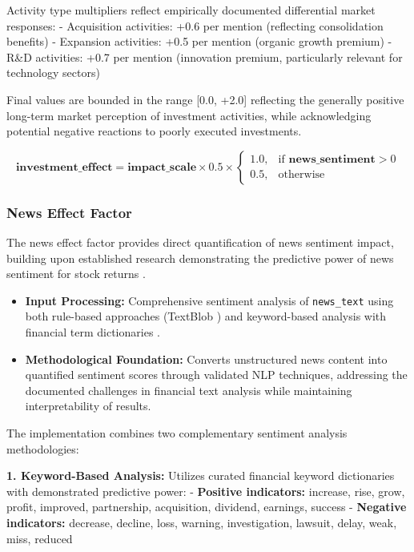 \documentclass[3p,times,procedia]{elsarticle}
\begin{document}
Activity type multipliers reflect empirically documented differential market responses:
- Acquisition activities: +0.6 per mention (reflecting consolidation benefits)
- Expansion activities: +0.5 per mention (organic growth premium)
- R\&D activities: +0.7 per mention (innovation premium, particularly relevant for technology sectors)

Final values are bounded in the range [0.0, +2.0] reflecting the generally positive long-term market perception of investment activities, while acknowledging potential negative reactions to poorly executed investments.

\begin{equation}
\textbf{investment\_effect} = \textbf{impact\_scale} \times 0.5 \times 
\begin{cases} 
1.0, & \text{if } \textbf{news\_sentiment} > 0 \\
0.5, & \text{otherwise}
\end{cases}
\end{equation}

\subsubsection{{News Effect Factor}}

The news effect factor provides direct quantification of news sentiment impact, building upon established research demonstrating the predictive power of news sentiment for stock returns \cite{TETLOCK2007,Schumaker2009}.

\begin{itemize}
    \item \textbf{Input Processing:} Comprehensive sentiment analysis of \texttt{news\_text} using both rule-based approaches (TextBlob \cite{Loria2019}) and keyword-based analysis with financial term dictionaries \cite{Loughran2011}.
    \item \textbf{Methodological Foundation:} Converts unstructured news content into quantified sentiment scores through validated NLP techniques, addressing the documented challenges in financial text analysis while maintaining interpretability of results.
\end{itemize}

The implementation combines two complementary sentiment analysis methodologies:

\textbf{1. Keyword-Based Analysis:} Utilizes curated financial keyword dictionaries with demonstrated predictive power:
- \textbf{Positive indicators:} increase, rise, grow, profit, improved, partnership, acquisition, dividend, earnings, success
- \textbf{Negative indicators:} decrease, decline, loss, warning, investigation, lawsuit, delay, weak, miss, reduced
\end{document}
